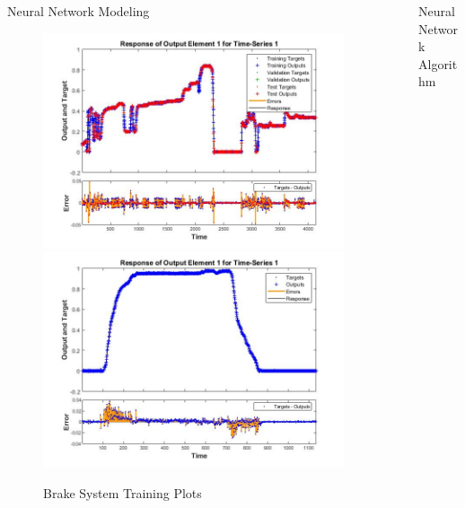 \documentclass[final]{beamer}
\newlength{\sepwid}
\newlength{\onecolwid}
\begin{document}
\begin{frame}[t]
\begin{columns}[t]
\begin{column}{\onecolwid}
\begin{alertblock}{Neural Network Modeling}
\begin{figure}
    \centering
		{\includegraphics[width=0.48\linewidth]{figs/img/brake_new_neuralNetworkFig}}
		{\includegraphics[width=0.48\linewidth]{figs/img/brake_new_neuralNetworkFigLog2Test}}
	\caption{Brake System Training Plots}
    \label{fig:BrakeSysNeuralNetwork}
\end{figure}


\end{alertblock}



\end{column} %

\begin{column}{\sepwid}\end{column} %

\begin{column}{\onecolwid} %

\begin{alertblock}{Neural Network Algorithm}
\vskip 0.5cm

 \begin{figure}
  \centering


\end{figure}
\end{alertblock}
\end{column}
\end{columns}
\end{frame}
\end{document}
